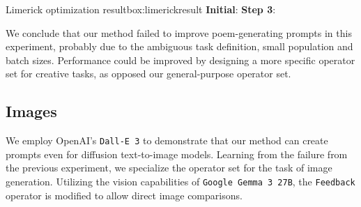 \begin{figurebox}{Limerick optimization result}{box:limerickresult}
\textbf{Initial}:
\textbf{Step 3}:
\end{figurebox}

We conclude that our method failed to improve poem-generating prompts in this experiment, probably due to the 
ambiguous task definition, small population and batch sizes. Performance could be improved by designing 
a more specific operator set for creative tasks, as opposed our general-purpose operator set.

\subsection{Images}
We employ OpenAI's \texttt{Dall-E 3}\cite{BetkerImprovingIG} to demonstrate that our method can create prompts even for diffusion text-to-image models.
Learning from the failure from the previous experiment, we specialize the operator set for the task of image generation.
Utilizing the vision capabilities of \texttt{Google Gemma 3 27B}, the \texttt{Feedback} operator is modified to allow direct image comparisons. 

